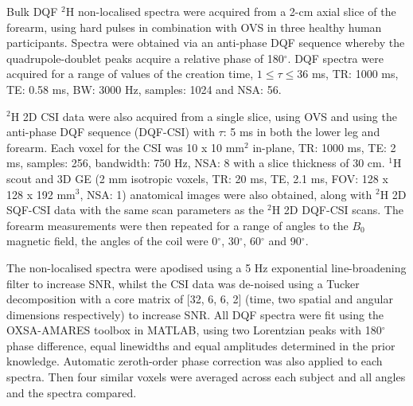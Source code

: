Bulk \ac{DQF} $^2$H non-localised spectra were acquired from a 2-cm axial slice of the forearm, using hard pulses in combination with \ac{OVS} in three healthy human participants. Spectra were obtained via an anti-phase \ac{DQF} sequence \cite{Sharf1995DetectionNMR-Spectroscopy} whereby the quadrupole-doublet peaks acquire a relative phase of 180$^\circ$. \ac{DQF} spectra were acquired for a range of values of the creation time, $1\leq\tau\leq36$ ms, \ac{TR}: 1000 ms, \ac{TE}: 0.58 ms, \ac{BW}: 3000 Hz, samples: 1024 and NSA: 56.

$^2$H 2D \ac{CSI} data were also acquired from a single slice, using \ac{OVS} and using the anti-phase \ac{DQF} sequence (\ac{DQF}-\ac{CSI}) with $\tau$: 5 ms in both the lower leg and forearm. Each voxel for the \ac{CSI} was 10 x 10 mm$^2$ in-plane, \ac{TR}: 1000 ms, \ac{TE}: 2 ms, samples: 256, bandwidth: 750 Hz, NSA: 8 with a slice thickness of 30 cm. $^1$H scout and 3D \ac{GE} (2 mm isotropic voxels, \ac{TR}: 20 ms, \ac{TE}, 2.1 ms, \ac{FOV}: 128 x 128 x 192 mm$^3$, NSA: 1) anatomical images were also obtained, along with $^2$H 2D \ac{SQF}-\ac{CSI} data with the same scan parameters as the $^2$H 2D \ac{DQF}-\ac{CSI} scans. The forearm measurements were then repeated for a range of angles to the $B_0$ magnetic field, the angles of the coil were 0$^\circ$, 30$^\circ$, 60$^\circ$ and 90$^\circ$. 

The non-localised spectra were apodised using a 5 Hz exponential line-broadening filter to increase \ac{SNR}, whilst the \ac{CSI} data was de-noised using a Tucker decomposition \cite{Bader2007EfficientTensors} with a core matrix of [32, 6, 6, 2] (time, two spatial and angular dimensions respectively) to increase \ac{SNR}. All \ac{DQF} spectra were fit using the OXSA-AMARES \cite{Purvis2017OXSA:MATLAB} toolbox in MATLAB, using two Lorentzian peaks with 180$^\circ$ phase difference, equal linewidths and equal amplitudes determined in the prior knowledge. Automatic zeroth-order phase correction was also applied to each spectra. Then four similar voxels were averaged across each subject and all angles and the spectra compared.

